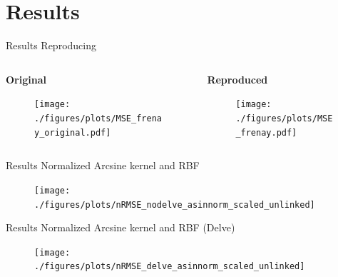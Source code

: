 \documentclass[aspectratio=169]{beamer}
\begin{document}
\section{Results}

\begin{frame}{Results \textendash{} Reproducing \textcite{frenayParameterinsensitiveKernelExtreme2011}}
	\begin{columns}
		\begin{column}{0.47\textwidth}
			\centering \textbf{Original}
			\begin{figure}[H]
				\texttt{[image: ./figures/plots/MSE\_frenay\_original.pdf]}
			\end{figure}
		\end{column}
		\begin{column}{0.47\textwidth}
			\centering \textbf{Reproduced}
			\begin{figure}[H]
				\texttt{[image: ./figures/plots/MSE\_frenay.pdf]}
			\end{figure}
		\end{column}
	\end{columns}
\end{frame}

\begin{frame}{Results \textendash{} Normalized Arcsine kernel and RBF}
	\begin{figure}[H]
		\texttt{[image: ./figures/plots/nRMSE\_nodelve\_asinnorm\_scaled\_unlinked]}
	\end{figure}
\end{frame}

\begin{frame}{Results \textendash{} Normalized Arcsine kernel and RBF (Delve)}
	\begin{figure}[H]
		\texttt{[image: ./figures/plots/nRMSE\_delve\_asinnorm\_scaled\_unlinked]}
	\end{figure}
\end{frame}

\end{document}
